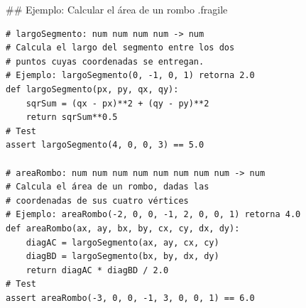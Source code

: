 \trmcolumns

## Ejemplo: Calcular el área de un rombo {.fragile}


\begin{lstlisting}[basicstyle=\scriptsize\ttfamily,style=frame01]
# largoSegmento: num num num num -> num
# Calcula el largo del segmento entre los dos
# puntos cuyas coordenadas se entregan.
# Ejemplo: largoSegmento(0, -1, 0, 1) retorna 2.0
def largoSegmento(px, py, qx, qy):
    sqrSum = (qx - px)**2 + (qy - py)**2
    return sqrSum**0.5
# Test
assert largoSegmento(4, 0, 0, 3) == 5.0

# areaRombo: num num num num num num num num -> num
# Calcula el área de un rombo, dadas las
# coordenadas de sus cuatro vértices
# Ejemplo: areaRombo(-2, 0, 0, -1, 2, 0, 0, 1) retorna 4.0
def areaRombo(ax, ay, bx, by, cx, cy, dx, dy):
    diagAC = largoSegmento(ax, ay, cx, cy)
    diagBD = largoSegmento(bx, by, dx, dy)
    return diagAC * diagBD / 2.0
# Test
assert areaRombo(-3, 0, 0, -1, 3, 0, 0, 1) == 6.0
\end{lstlisting}

